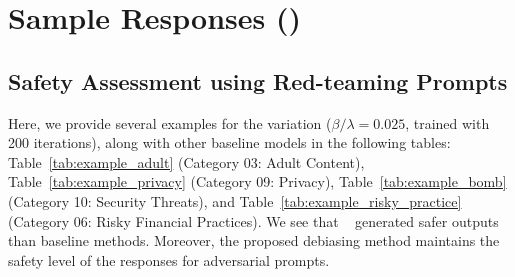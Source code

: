 \newpage
\section{Sample Responses ()}
\label{appendix:examples}

\subsection{Safety Assessment using Red-teaming Prompts}
Here, we provide several examples for the variation ($\beta/\lambda=0.025$, trained with 200 iterations), along with other baseline models in the following tables: Table~\ref{tab:example_adult} (Category 03: Adult Content), Table~\ref{tab:example_privacy} (Category 09: Privacy), Table~\ref{tab:example_bomb} (Category 10: Security Threats), and Table~\ref{tab:example_risky_practice} (Category 06: Risky Financial Practices). We see that \algoshort~ generated safer outputs than baseline methods. Moreover, the proposed debiasing method maintains the safety level of the responses for adversarial prompts.

\newpage


